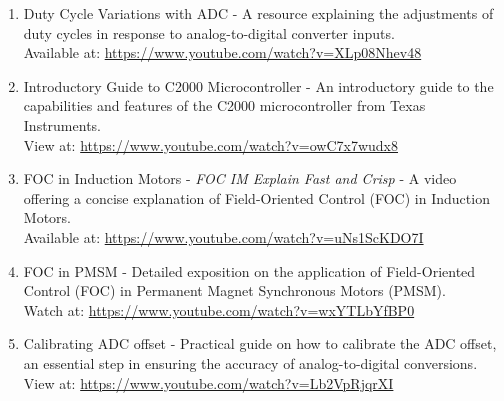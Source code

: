 \begin{enumerate}
    \item Duty Cycle Variations with ADC - A resource explaining the adjustments of duty cycles in response to analog-to-digital converter inputs.\\
    Available at: \url{https://www.youtube.com/watch?v=XLp08Nhev48}

    \item Introductory Guide to C2000 Microcontroller - An introductory guide to the capabilities and features of the C2000 microcontroller from Texas Instruments.\\
    View at: \url{https://www.youtube.com/watch?v=owC7x7wudx8}
    
    \item FOC in Induction Motors - \textit{FOC IM Explain Fast and Crisp} - A video offering a concise explanation of Field-Oriented Control (FOC) in Induction Motors.\\
    Available at: \url{https://www.youtube.com/watch?v=uNs1ScKDO7I}
    
    \item FOC in PMSM - Detailed exposition on the application of Field-Oriented Control (FOC) in Permanent Magnet Synchronous Motors (PMSM).\\
    Watch at: \url{https://www.youtube.com/watch?v=wxYTLbYfBP0}
    
    \item Calibrating ADC offset - Practical guide on how to calibrate the ADC offset, an essential step in ensuring the accuracy of analog-to-digital conversions.\\
    View at: \url{https://www.youtube.com/watch?v=Lb2VpRjqrXI}
\end{enumerate}

